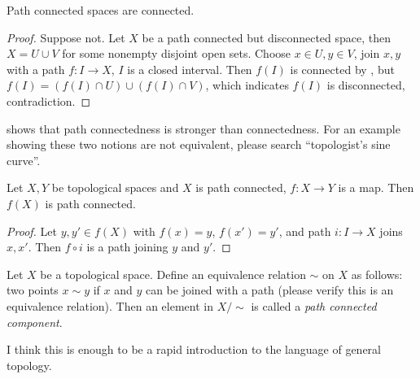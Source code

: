 \begin{lem}\label{lem:path connected}
    Path connected spaces are connected.
\end{lem}
\begin{proof}
    Suppose not.
    Let $X$ be a path connected but disconnected space, then $X=U\cup V$ for some nonempty disjoint open sets.
    Choose $x\in U,y\in V$, join $x,y$ with a path $f:I\to X$, $I$ is a closed interval.
    Then $f(I)$ is connected by , but $f(I)=(f(I)\cap U)\cup(f(I)\cap V)$, which indicates $f(I)$ is disconnected, contradiction.
\end{proof}

\begin{rem}
     shows that path connectedness is stronger than connectedness.
    For an example showing these two notions are not equivalent, please search ``topologist's sine curve''.
\end{rem}

\begin{prop}
    Let $X,Y$ be topological spaces and $X$ is path connected, $f:X\to Y$ is a map.
    Then $f(X)$ is path connected.
\end{prop}
\begin{proof}
    Let $y,y'\in f(X)$ with $f(x)=y$, $f(x')=y'$, and path $i:I\to X$ joins $x,x'$.
    Then $f\circ i$ is a path joining $y$ and $y'$.
\end{proof}

\begin{defn}
    Let $X$ be a topological space.
    Define an equivalence relation $\sim$ on $X$ as follows:
    two points $x\sim y$ if $x$ and $y$ can be joined with a path (please verify this is an equivalence relation).
    Then an element in $X/\sim$ is called a \emph{path connected component}.
\end{defn}

I think this is enough to be a rapid introduction to the language of general topology.